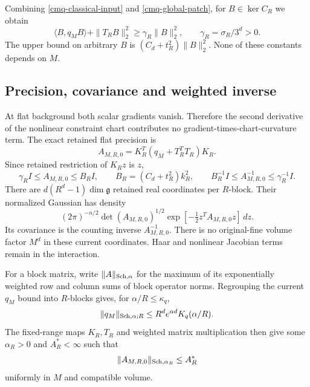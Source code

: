 \documentclass[11pt]{article}
\theoremstyle{remark}
\begin{document}
Combining \eqref{cmq-classical-input} and
\eqref{cmq-global-patch}, for $B\in\ker C_R$ we obtain
\begin{equation}
 \langle B,q_MB\rangle+\|T_RB\|_2^2
 \geq\gamma_R\|B\|_2^2,\qquad
 \gamma_R=\sigma_R/3^d>0.
 \label{cmq-field-gap}
\end{equation}
The upper bound on arbitrary $B$ is
$(C_d+t_R^2)\|B\|_2^2$. None of these constants depends on $M$.

\subsection{Precision, covariance and weighted inverse}
\label{cmq-inverse-section}

At flat background both scalar gradients vanish. Therefore the
second derivative of the nonlinear constraint chart contributes
no gradient-times-chart-curvature term. The exact retained flat
precision is
\begin{equation}
 A_{M,R,0}=K_R^T(q_M+T_R^TT_R)K_R.
 \label{cmq-flat-precision}
\end{equation}
Since retained restriction of $K_Rz$ is $z$,
\begin{equation}
 \gamma_R I\leq A_{M,R,0}\leq B_R I,\qquad
 B_R=(C_d+t_R^2)k_R^2,\qquad
 B_R^{-1}I\leq A_{M,R,0}^{-1}\leq\gamma_R^{-1}I.
 \label{cmq-sandwich}
\end{equation}
There are $d(R^d-1)\dim\mathfrak g$ retained real coordinates
per $R$-block. Their normalized Gaussian has density
\begin{equation}
 (2\pi)^{-n/2}\det(A_{M,R,0})^{1/2}
        \exp[-\tfrac12 z^TA_{M,R,0}z]\,dz.
 \label{cmq-density}
\end{equation}
Its covariance is the counting inverse $A_{M,R,0}^{-1}$.
There is no original-fine volume factor $M^d$ in these current
coordinates. Haar and nonlinear Jacobian terms remain in the
interaction.

For a block matrix, write $\|A\|_{{\rm Sch},\alpha}$ for the
maximum of its exponentially weighted row and column sums of
block operator norms. Regrouping the current $q_M$ bound into
$R$-blocks gives, for $\alpha/R\leq\kappa_q$,
\begin{equation}
 \|q_M\|_{{\rm Sch},\alpha;R}
 \leq R^d e^{\alpha d} K_q(\alpha/R).
 \label{cmq-regroup}
\end{equation}
The fixed-range maps $K_R,T_R$ and weighted matrix
multiplication then give some $\alpha_R>0$ and $A_R^*<\infty$
such that
\begin{equation}
 \|A_{M,R,0}\|_{{\rm Sch},\alpha_R}\leq A_R^*
 \label{cmq-precision-schur}
\end{equation}
uniformly in $M$ and compatible volume.
\end{document}
